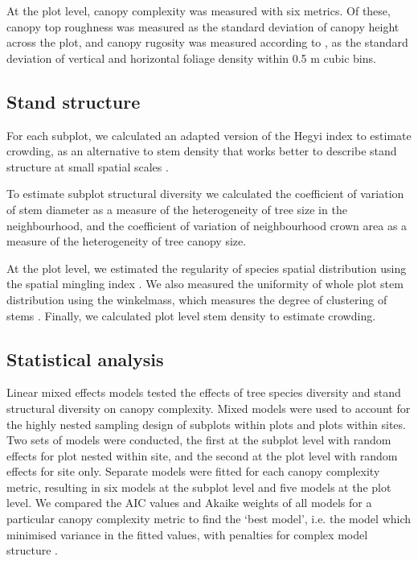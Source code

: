 \documentclass[11pt,a4paper]{article}
\begin{document}
At the plot level, canopy complexity was measured with six metrics. Of these, canopy top roughness was measured as the standard deviation of canopy height across the plot, and canopy rugosity was measured according to \citet{Hardiman2011}, as the standard deviation of vertical and horizontal foliage density within 0.5 m cubic bins.

\subsection{Stand structure}

For each subplot, we calculated an adapted version of the Hegyi index to estimate crowding, as an alternative to stem density that works better to describe stand structure at small spatial scales \citep{Hegyi1974}. 

To estimate subplot structural diversity we calculated the coefficient of variation of stem diameter as a measure of the heterogeneity of tree size in the neighbourhood, and the coefficient of variation of neighbourhood crown area as a measure of the heterogeneity of tree canopy size.

At the plot level, we estimated the regularity of species spatial distribution using the spatial mingling index \citep{Gadow2002}. We also measured the uniformity of whole plot stem distribution using the winkelmass, which measures the degree of clustering of stems \citep{Gadow2002}. Finally, we calculated plot level stem density to estimate crowding.

\subsection{Statistical analysis}

Linear mixed effects models tested the effects of tree species diversity and stand structural diversity on canopy complexity. Mixed models were used to account for the highly nested sampling design of subplots within plots and plots within sites. Two sets of models were conducted, the first at the subplot level with random effects for plot nested within site, and the second at the plot level with random effects for site only. Separate models were fitted for each canopy complexity metric, resulting in six models at the subplot level and five models at the plot level. We compared the AIC values and Akaike weights of all models for a particular canopy complexity metric to find the `best model', i.e. the model which minimised variance in the fitted values, with penalties for complex model structure \citep{Akaike}.
\end{document}
